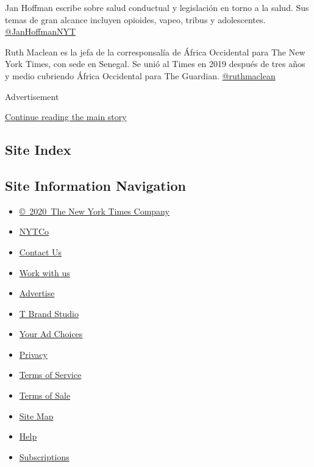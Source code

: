 Jan Hoffman escribe sobre salud conductual y legislación en torno a la
salud. Sus temas de gran alcance incluyen opioides, vapeo, tribus y
adolescentes. \href{https://twitter.com/JanHoffmanNYT}{@JanHoffmanNYT}

Ruth Maclean es la jefa de la corresponsalía de África Occidental para
The New York Times, con sede en Senegal. Se unió al Times en 2019
después de tres años y medio cubriendo África Occidental para The
Guardian. \href{https://twitter.com/ruthmaclean}{@ruthmaclean}

Advertisement

\protect\hyperlink{after-bottom}{Continue reading the main story}

\hypertarget{site-index}{%
\subsection{Site Index}\label{site-index}}

\hypertarget{site-information-navigation}{%
\subsection{Site Information
Navigation}\label{site-information-navigation}}

\begin{itemize}
\tightlist
\item
  \href{https://help.nytimes3xbfgragh.onion/hc/en-us/articles/115014792127-Copyright-notice}{©~2020~The
  New York Times Company}
\end{itemize}

\begin{itemize}
\tightlist
\item
  \href{https://www.nytco.com/}{NYTCo}
\item
  \href{https://help.nytimes3xbfgragh.onion/hc/en-us/articles/115015385887-Contact-Us}{Contact
  Us}
\item
  \href{https://www.nytco.com/careers/}{Work with us}
\item
  \href{https://nytmediakit.com/}{Advertise}
\item
  \href{http://www.tbrandstudio.com/}{T Brand Studio}
\item
  \href{https://www.nytimes3xbfgragh.onion/privacy/cookie-policy\#how-do-i-manage-trackers}{Your
  Ad Choices}
\item
  \href{https://www.nytimes3xbfgragh.onion/privacy}{Privacy}
\item
  \href{https://help.nytimes3xbfgragh.onion/hc/en-us/articles/115014893428-Terms-of-service}{Terms
  of Service}
\item
  \href{https://help.nytimes3xbfgragh.onion/hc/en-us/articles/115014893968-Terms-of-sale}{Terms
  of Sale}
\item
  \href{https://spiderbites.nytimes3xbfgragh.onion}{Site Map}
\item
  \href{https://help.nytimes3xbfgragh.onion/hc/en-us}{Help}
\item
  \href{https://www.nytimes3xbfgragh.onion/subscription?campaignId=37WXW}{Subscriptions}
\end{itemize}
